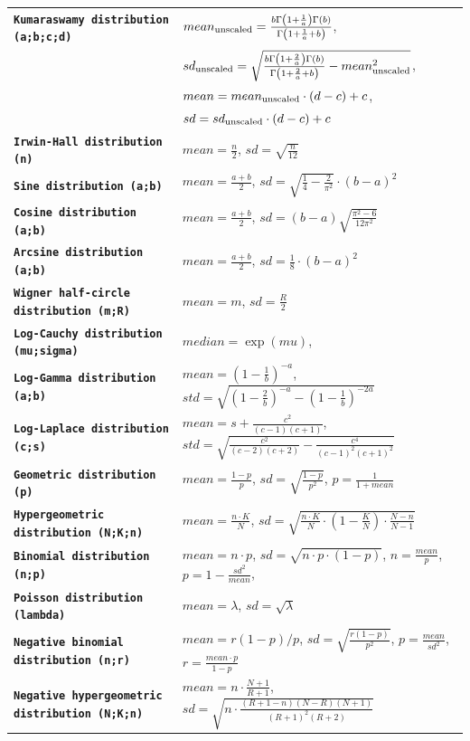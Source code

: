 \documentclass{svmono}
\def\cm#1{\textbf{\texttt{#1}}}
\begin{document}
{\begin{longtable}{l|l}
\cm{Kumaraswamy distribution (a;b;c;d)} & $mean_{\rm unscaled} = \frac{b\Gamma\left(1+\frac{1}{a}\right)\Gamma(b)}{\Gamma\left(1+\frac{1}{a}+b\right)}$,\\
~ & $sd_{\rm unscaled} = \sqrt{\frac{b\Gamma\left(1+\frac{2}{a}\right)\Gamma(b)}{\Gamma\left(1+\frac{2}{a}+b\right)}-mean_{\rm unscaled}^2}$,\\
~ & $mean = mean_{\rm unscaled}\cdot(d-c)+c$,\\
~ & $sd = sd_{\rm unscaled}\cdot(d-c)+c$ \\
\cm{Irwin-Hall distribution (n)} & $mean = \frac{n}{2}$, $sd = \sqrt{\frac{n}{12}}$ \\
\cm{Sine distribution (a;b)} & $mean = \frac{a+b}{2}$, $sd = \sqrt{\frac{1}{4}-\frac{2}{\pi^2}}\cdot(b-a)^2$ \\
\cm{Cosine distribution (a;b)} & $mean = \frac{a+b}{2}$, $sd = (b-a)\sqrt{\frac{\pi^2-6}{12\pi^2}}$ \\
\cm{Arcsine distribution (a;b)} & $mean = \frac{a+b}{2}$, $sd = \frac{1}{8}\cdot(b-a)^2$ \\
\cm{Wigner half-circle distribution (m;R)} & $mean = m$, $sd = \frac{R}{2}$ \\
\cm{Log-Cauchy distribution (mu;sigma)} & $median = \exp(mu)$,\\
\cm{Log-Gamma distribution (a;b)} & $mean=\left(1-\frac{1}{b}\right)^{-a}$, $std=\sqrt{\left(1-\frac{2}{b}\right)^{-a}-\left(1-\frac{1}{b}\right)^{-2a}}$ \\
\cm{Log-Laplace distribution (c;s)} & $mean=s+\frac{c^2}{(c-1)(c+1)}$, $std=\sqrt{\frac{c^2}{(c-2)(c+2)}-\frac{c^4}{(c-1)^2(c+1)^2}}$ \\
\cm{Geometric distribution (p)} & $mean=\frac{1-p}{p}$, $sd=\sqrt{\frac{1-p}{p^2}}$, $p=\frac{1}{1+mean}$ \\
\cm{Hypergeometric distribution (N;K;n)} & $mean=\frac{n\cdot K}{N}$, $sd=\sqrt{\frac{n\cdot K}{N}\cdot\left(1-\frac{K}{N}\right)\cdot\frac{N-n}{N-1}}$ \\
\cm{Binomial distribution (n;p)} & $mean=n\cdot p$, $sd=\sqrt{n\cdot p\cdot (1-p)}$, $n=\frac{mean}{p}$, $p=1-\frac{sd^2}{mean}$, \\
\cm{Poisson distribution (lambda)} & $mean=\lambda$, $sd=\sqrt{\lambda}$ \\
\cm{Negative binomial distribution (n;r)} & $mean=r(1-p)/p$, $sd=\sqrt{\frac{r(1-p)}{p^2}}$, $p=\frac{mean}{sd^2}$, $r=\frac{mean\cdot p}{1-p}$ \\
\cm{Negative hypergeometric distribution (N;K;n)} & $mean=n\cdot\frac{N+1}{R+1}$, $sd=\sqrt{n\cdot\frac{(R+1-n)(N-R)(N+1)}{(R+1)^2(R+2)}}$ \\

\end{longtable}}
\end{document}
